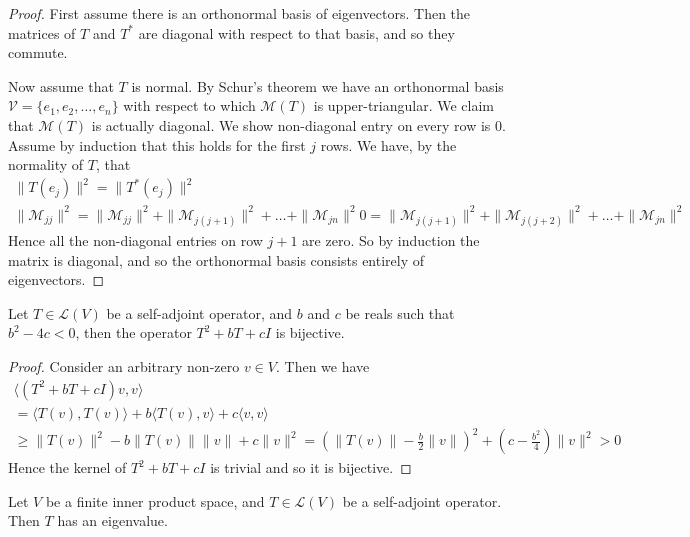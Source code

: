 \documentclass[]{article}
\begin{document}
\begin{proof}
		First assume there is an orthonormal basis of eigenvectors. Then the matrices of $T$ and $T^*$ are diagonal with respect to that basis, and so they commute.	

		Now assume that $T$ is normal. By Schur's theorem we have an orthonormal basis $\mathcal{V} = \{e_1,e_2,\ldots,e_n\}$ with respect to which $\mathcal{M}(T)$ is upper-triangular. We claim that $\mathcal{M}(T)$ is actually diagonal. We show non-diagonal entry on every row is $0$. Assume by induction that this holds for the first $j$ rows. We have, by the normality of $T$, that
		\begin{align*}
				\|T(e_j)\|^2 = \|T^*(e_j)\|^2 \\
				\|\mathcal{M}_{jj}\|^2 = \|\mathcal{M}_{jj}\|^2 + \|\mathcal{M}_{j(j+1)}\|^2 + \ldots +  \|\mathcal{M}_{jn}\|^2 
				0 = \|\mathcal{M}_{j(j+1)}\|^2 + \|\mathcal{M}_{j(j+2)}\|^2 + \ldots +  \|\mathcal{M}_{jn}\|^2 
		\end{align*}
		Hence all the non-diagonal entries on row $j+1$ are zero. So by induction the matrix is diagonal, and so the orthonormal basis consists entirely of eigenvectors.
\end{proof}

\begin{thm} \label{thm:irreducible-quadratics}
		Let $T \in \mathcal{L}(V)$ be a self-adjoint operator, and $b$ and $c$ be reals such that $b^2 - 4c < 0$, then the operator $T^2 + bT + cI$ is bijective.
\end{thm}

\begin{proof}
		Consider an arbitrary non-zero $v \in V$. Then we have 
		\begin{align*}
				\langle (T^2 + bT + cI)v, v \rangle  \\
				= \langle T(v), T(v) \rangle + b\langle T(v), v \rangle + c \langle v, v \rangle \\
				\geq \|T(v)\|^2 - b \|T(v)\|\|v\| + c \|v\|^2
				= (\|T(v)\| - \frac{b}{2} \|v\|)^2 + (c - \frac{b^2}{4})\|v\|^2
				> 0
		\end{align*}
		Hence the kernel of  $T^2 + bT + cI$ is trivial and so it is bijective.
\end{proof}

\begin{thm}
		Let $V$ be a finite inner product space, and $T \in \mathcal{L}(V)$ be a self-adjoint operator. Then $T$ has an eigenvalue.
\end{thm}
\end{document}
